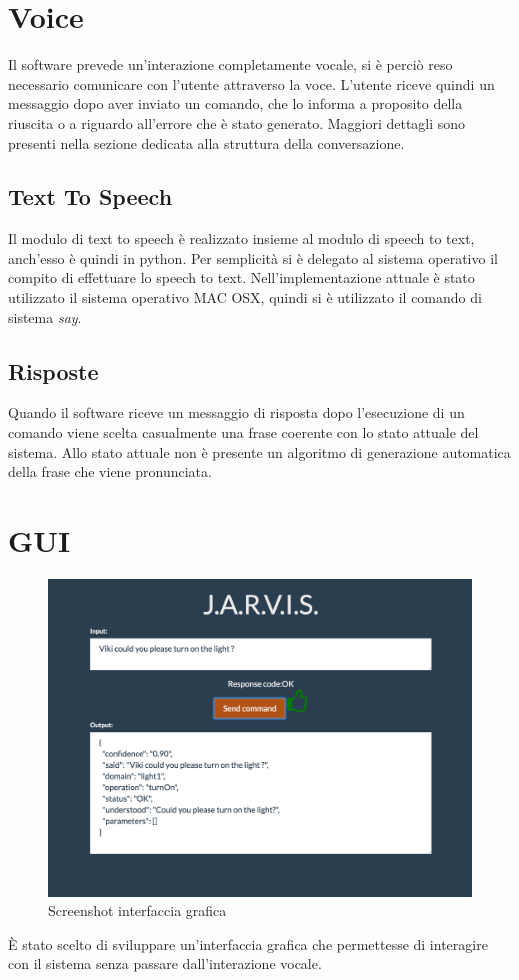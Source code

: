 \documentclass[twoside]{supsistudent}
\begin{document}
\chapter{Voice}

Il software prevede un'interazione completamente vocale, si è perciò reso necessario comunicare con l'utente attraverso la voce.
L'utente riceve quindi un messaggio dopo aver inviato un comando, che lo informa a proposito della riuscita o a riguardo all'errore che è stato generato. Maggiori dettagli sono presenti nella sezione dedicata alla struttura della conversazione.
\section{Text To Speech}
Il modulo di text to speech è realizzato insieme al modulo di speech to text, anch'esso è quindi in python. Per semplicità si è delegato al sistema operativo il compito di effettuare lo speech to text. Nell'implementazione attuale è stato utilizzato il sistema operativo MAC OSX, quindi si è utilizzato il comando di sistema \textit{say}.

\section{Risposte}
Quando il software riceve un messaggio di risposta dopo l'esecuzione di un comando viene scelta casualmente una frase coerente con lo stato attuale del sistema.
Allo stato attuale non è presente un algoritmo di generazione automatica della frase che viene pronunciata.

\chapter{GUI}
\begin{figure}[H]
\centering
\includegraphics[width=\textwidth]{Gui}
\caption{Screenshot interfaccia grafica}
\label{fig:pose}
\end{figure}
È stato scelto di sviluppare un'interfaccia grafica che permettesse di interagire con il sistema senza passare dall'interazione vocale.
\end{document}
